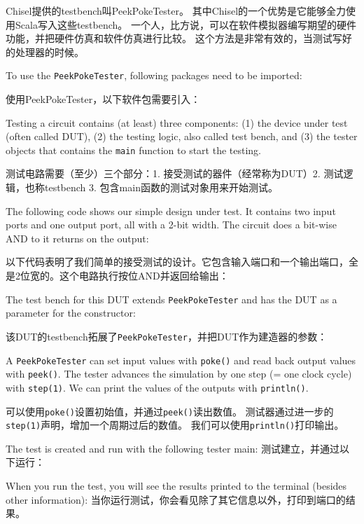 \documentclass[%
    10pt,
    headinclude, footexclude,
    openright, %
    notitlepage,
    cleardoubleempty,
    headsepline,
    pointlessnumbers,
    bibtotoc, idxtotoc,
    ]{scrbook}
\newcommand{\code}[1]{{\small{\texttt{#1}}}}
\begin{document}
Chisel提供的testbench叫PeekPokeTester。
其中Chisel的一个优势是它能够全力使用Scala写入这些testbench。
一个人，比方说，可以在软件模拟器编写期望的硬件功能，并把硬件仿真和软件仿真进行比较。
这个方法是非常有效的，当测试写好的处理器的时候。

To use the \code{PeekPokeTester}, following packages need to be imported:

使用PeekPokeTester，以下软件包需要引入：


\noindent Testing a circuit contains (at least) three components: (1) the device under test (often
called DUT), (2) the testing logic, also called test bench, and (3) the tester objects
that contains the \code{main} function to start the testing.

测试电路需要（至少）三个部分：1. 接受测试的器件（经常称为DUT）2. 测试逻辑，也称testbench 3. 包含main函数的测试对象用来开始测试。

The following code shows our simple design under test. It contains two input
ports and one output port, all with a 2-bit width. The circuit does a bit-wise AND
to it returns on the output:

以下代码表明了我们简单的接受测试的设计。它包含输入端口和一个输出端口，全是2位宽的。这个电路执行按位AND并返回给输出：


\noindent The test bench for this DUT extends \code{PeekPokeTester} and has
the DUT as a parameter for the constructor:

该DUT的testbench拓展了\code{PeekPokeTester}，并把DUT作为建造器的参数：


\noindent A \code{PeekPokeTester} can set input values with \code{poke()} and
read back output values with \code{peek()}. The tester advances the simulation by one
step (= one clock cycle) with \code{step(1)}.
We can print the values of the outputs with \code{println()}.

\noindent \code{PeekPokeTester} 可以使用\code{poke()}设置初始值，并通过\code{peek()}读出数值。
测试器通过进一步的\code{step(1)}声明，增加一个周期过后的数值。
我们可以使用\code{println()}打印输出。

The test is created and run with the following tester main:
测试建立，并通过以下运行：


\noindent When you run the test, you will see the results printed to the terminal
(besides other information):
\noindent 当你运行测试，你会看见除了其它信息以外，打印到端口的结果。
\end{document}
